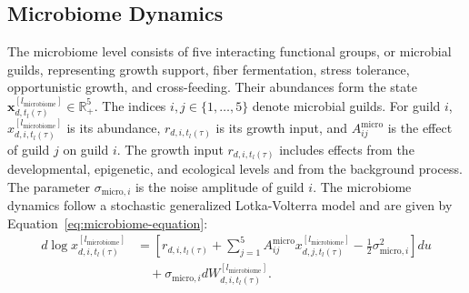 \documentclass[11pt]{article}
\begin{document}
\subsection{Microbiome Dynamics}
The microbiome level consists of five interacting functional groups, or microbial guilds, representing growth support, fiber fermentation, stress tolerance, opportunistic growth, and cross-feeding. Their abundances form the state $\mathbf{x}^{[l_{\mathrm{microbiome}}]}_{d,t_l(\tau)}\in\mathbb{R}_{+}^{5}$. The indices $i,j\in\{1,\ldots,5\}$ denote microbial guilds. For guild $i$, $x^{[l_{\mathrm{microbiome}}]}_{d,i,t_l(\tau)}$ is its abundance, $r_{d,i,t_l(\tau)}$ is its growth input, and $A^{\mathrm{micro}}_{ij}$ is the effect of guild $j$ on guild $i$. The growth input $r_{d,i,t_l(\tau)}$ includes effects from the developmental, epigenetic, and ecological levels and from the background process. The parameter $\sigma_{\mathrm{micro},i}$ is the noise amplitude of guild $i$. The microbiome dynamics follow a stochastic generalized Lotka-Volterra model \cite{stein2013,bucci2016} and are given by Equation~\ref{eq:microbiome-equation}:
\begin{equation}
\begin{aligned}
d\log
x^{[l_{\mathrm{microbiome}}]}_{d,i,t_l(\tau)}
&=
\left[
r_{d,i,t_l(\tau)}
+
\sum_{j=1}^{5}
A^{\mathrm{micro}}_{ij}
x^{[l_{\mathrm{microbiome}}]}_{d,j,t_l(\tau)}
-
\frac{1}{2}\sigma_{\mathrm{micro},i}^{2}
\right]du
\\
&\quad+
\sigma_{\mathrm{micro},i}
dW^{[l_{\mathrm{microbiome}}]}_{d,i,t_l(\tau)} .
\end{aligned}
\label{eq:microbiome-equation}
\end{equation}
\end{document}
